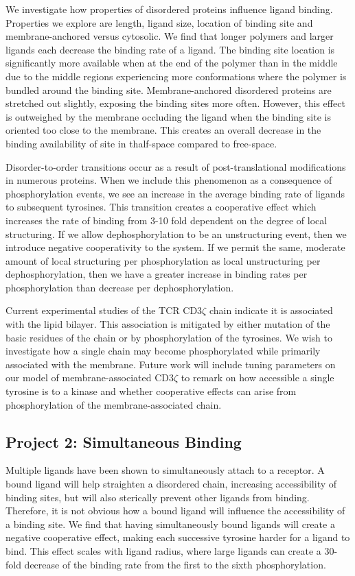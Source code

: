 \documentclass[onecolumn]{article}
\begin{document}
We investigate how properties of disordered proteins influence ligand binding. Properties we explore are length, ligand size, location of binding site and membrane-anchored versus cytosolic. We find that longer polymers and larger ligands each decrease the binding rate of a ligand. The binding site location is significantly more available when at the end of the polymer than in the middle due to the middle regions experiencing more conformations where the polymer is bundled around the binding site. Membrane-anchored disordered proteins are stretched out slightly, exposing the binding sites more often. However, this effect is outweighed by the membrane occluding the ligand when the binding site is oriented too close to the membrane. This creates an overall decrease in the binding availability of site in thalf-space compared to free-space.

Disorder-to-order transitions occur as a result of post-translational modifications in numerous proteins. When we include this phenomenon as a consequence of phosphorylation events, we see an increase in the average binding rate of ligands to subsequent tyrosines. This transition creates a cooperative effect which increases the rate of binding from 3-10 fold dependent on the degree of local structuring. If we allow dephosphorylation to be an unstructuring event, then we introduce negative cooperativity to the system. If we permit the same, moderate amount of local structuring per phosphorylation as local unstructuring per dephosphorylation, then we have a greater increase in binding rates per phosphorylation than decrease per dephosphorylation.

Current experimental studies of the TCR CD3$\zeta$ chain indicate it is associated with the lipid bilayer. This association is mitigated by either mutation of the basic residues of the chain or by phosphorylation of the tyrosines. We wish to investigate how a single chain may become phosphorylated while primarily associated with the membrane. Future work will include tuning parameters on our model of membrane-associated CD3$\zeta$ to remark on how accessible a single tyrosine is to a kinase and whether cooperative effects can arise from phosphorylation of the membrane-associated chain.

\subsection*{Project 2: Simultaneous Binding}

Multiple ligands have been shown to simultaneously attach to a receptor. A bound ligand will help straighten a disordered chain, increasing accessibility of binding sites, but will also sterically prevent other ligands from binding. Therefore, it is not obvious how a bound ligand will influence the accessibility of a binding site. We find that having simultaneously bound ligands will create a negative cooperative effect, making each successive tyrosine harder for a ligand to bind. This effect scales with ligand radius, where large ligands can create a 30-fold decrease of the binding rate from the first to the sixth phosphorylation.
\end{document}
